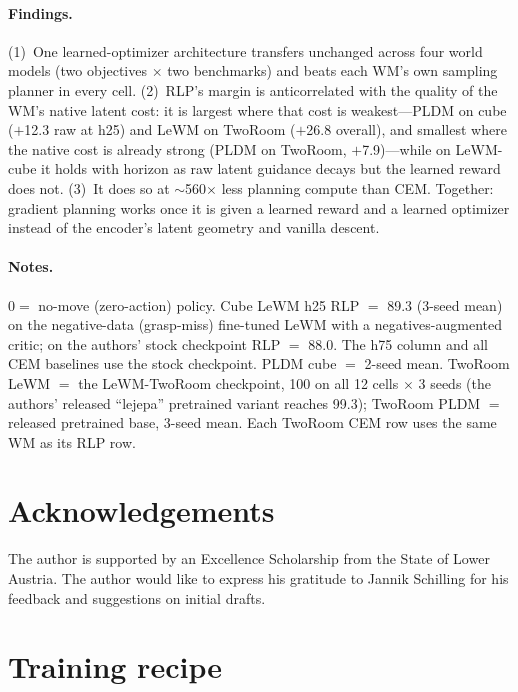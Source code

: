 \documentclass{article} %
\theoremstyle{plain}
\theoremstyle{definition}
\begin{document}
\paragraph{Findings.} (1)~One learned-optimizer architecture transfers unchanged
across four world models (two objectives $\times$ two benchmarks) and beats each
WM's own sampling planner in every cell. (2)~RLP's margin is anticorrelated with
the quality of the WM's native latent cost: it is largest where that cost is
weakest---PLDM on cube ($+$12.3 raw at h25) and LeWM on TwoRoom ($+$26.8
overall), and smallest where the native cost is already strong (PLDM on TwoRoom,
$+$7.9)---while on LeWM-cube it holds with horizon as raw latent guidance decays
but the learned reward does not. (3)~It does so at $\sim$560$\times$ less
planning compute than CEM. Together: gradient planning works once it is given a
learned reward and a learned optimizer instead of the encoder's latent geometry
and vanilla descent.

\paragraph{Notes.} $0=$ no-move (zero-action) policy. Cube LeWM h25 RLP $=$
89.3 (3-seed mean) on the negative-data (grasp-miss) fine-tuned LeWM with a
negatives-augmented critic; on the authors' stock checkpoint RLP $=$ 88.0. The
h75 column and all CEM baselines use the stock checkpoint. PLDM cube $=$ 2-seed
mean. TwoRoom LeWM $=$ the LeWM-TwoRoom checkpoint, 100 on all 12 cells
$\times$ 3 seeds (the authors' released ``lejepa'' pretrained variant reaches
99.3); TwoRoom PLDM $=$ released pretrained base, 3-seed mean. Each TwoRoom CEM
row uses the same WM as its RLP row.

\section{Acknowledgements}
The author is supported by an Excellence Scholarship from the State of Lower Austria. The author would like to express his gratitude to Jannik Schilling for his feedback and suggestions on initial drafts.





\newpage
\appendix
\onecolumn

\section{Training recipe}
\label{app:recipe}
\end{document}
